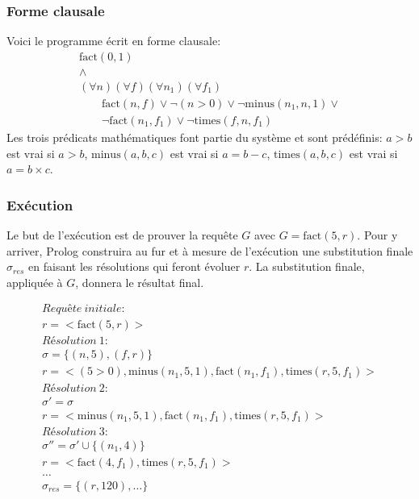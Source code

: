 \subsubsection{Forme clausale}
Voici le programme écrit en forme clausale:
\begin{equation}
\begin{array}{l}
\mathrm{fact}(0,1) \\
\wedge \\
(\forall n) (\forall f) (\forall n_1) (\forall f_1) \\
\quad \quad \mathrm{fact}(n,f) \vee \neg(n>0) \vee \neg \mathrm{minus}(n_1,n,1) \vee \\
\quad \quad \neg \mathrm{fact}(n_1,f_1) \vee \neg \mathrm{times}(f,n,f_1)
\end{array}
\end{equation}
Les trois prédicats mathématiques font partie du système et sont prédéfinis:
$a>b$ est vrai si $a>b$,
$\mathrm{minus}(a,b,c)$ est vrai si $a=b-c$,
$\mathrm{times}(a,b,c)$ est vrai si $a=b \times c$.

\subsubsection{Exécution} 

Le but de l'exécution est de prouver la requête $G$ avec $G = \mathrm{fact}(5, r)$.
Pour y arriver, Prolog construira au fur et à mesure de l'exécution
une substitution finale $\sigma_{res}$ en faisant les résolutions qui feront évoluer $r$.
La substitution finale, appliquée à $G$, donnera le résultat final.

\begin{equation}
\begin{array}{l}
\mathit{Requête\ initiale:}\\
r= < \mathrm{fact}(5, r) > \\
\mathit{Résolution\ 1:} \\
\sigma = \{ (n, 5), (f, r) \} \\
r= < (5>0), \mathrm{minus}(n_1, 5, 1), \mathrm{fact}(n_1, f_1), \mathrm{times}(r, 5, f_1) > \\
\mathit{Résolution\ 2:} \\
\sigma'=\sigma \\
r= < \mathrm{minus}(n_1, 5, 1), \mathrm{fact}(n_1, f_1), \mathrm{times}(r, 5, f_1) > \\
\mathit{Résolution\ 3:} \\
\sigma''= \sigma' \cup \{ (n_1, 4) \} \\
r= < \mathrm{fact}(4, f_1), \mathrm{times}(r, 5, f_1) > \\
\ldots \\
\sigma_{res} = \{(r,120), \ldots\} 
\end{array}
\end{equation}

